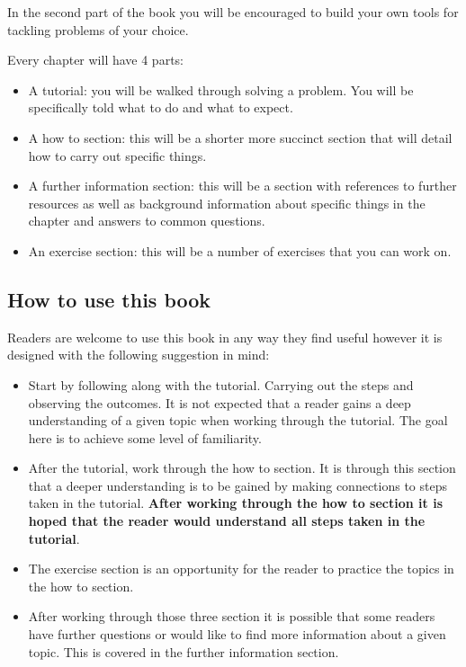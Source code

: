 In the second part of the book you will be encouraged to build your own tools
for tackling problems of your choice.

Every chapter will have 4 parts:

\begin{itemize}
\item A tutorial: you will be walked through solving a problem. You will be
specifically told what to do and what to expect.

\item A how to section: this will be a shorter more succinct section that will
detail how to carry out specific things.

\item 
A further information section: this will be a section with references to
further resources as well as background information about specific things in
the chapter and answers to common questions.

\item
An exercise section: this will be a number of exercises that you can work on.

\end{itemize}

\subsection{How to use this book}
Readers are welcome to use this book in any way they find useful however it is
designed with the following suggestion in mind:
\begin{itemize}
\item Start by following along with the tutorial. Carrying out the steps and
observing the outcomes. It is not expected that a reader gains a deep
understanding of a given topic when working through the tutorial. The goal
here is to achieve some level of familiarity.

\item After the tutorial, work through the how to section. It is through this
section that a deeper understanding is to be gained by making connections to
steps taken in the tutorial. \textbf{After working through the how to section it is
hoped that the reader would understand all steps taken in the tutorial}.

\item The exercise section is an opportunity for the reader to practice the topics
in the how to section.

\item After working through those three section it is possible that some readers
have further questions or would like to find more information about a
given topic. This is covered in the further information section.

\end{itemize}

